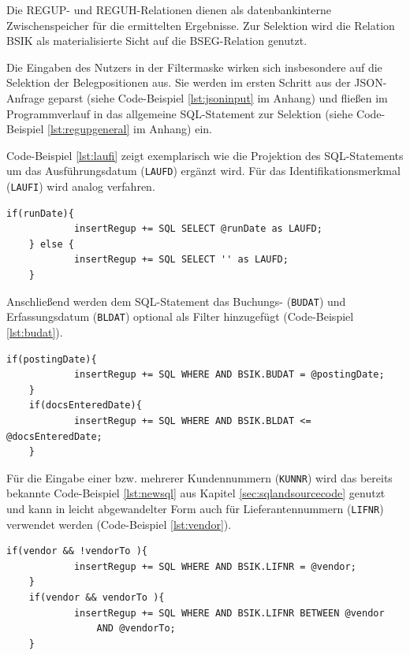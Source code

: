Die REGUP- und REGUH-Relationen dienen als datenbankinterne Zwischenspeicher für die ermittelten Ergebnisse.
Zur Selektion wird die Relation BSIK als materialisierte Sicht auf die BSEG-Relation genutzt.

Die Eingaben des Nutzers in der Filtermaske wirken sich insbesondere auf die Selektion der Belegpositionen aus.
Sie werden im ersten Schritt aus der JSON-Anfrage geparst (siehe Code-Beispiel \ref{lst:jsoninput} im Anhang) und fließen im Programmverlauf in das allgemeine SQL-Statement zur Selektion (siehe Code-Beispiel \ref{lst:regupgeneral} im Anhang) ein.

Code-Beispiel \ref{lst:laufi} zeigt exemplarisch wie die Projektion des SQL-Statements um das Ausführungsdatum (\texttt{LAUFD}) ergänzt wird.
Für das Identifikationsmerkmal (\texttt{LAUFI}) wird analog verfahren.

\begin{lstlisting}[caption={Ergänzung der Projektion um das Ausführungsdatum}, label={lst:laufi}, language=JavaScriptSQL]
	if(runDate){
			insertRegup += SQL SELECT @runDate as LAUFD;
	} else {
			insertRegup += SQL SELECT '' as LAUFD;
	}
\end{lstlisting}

Anschließend werden dem SQL-Statement das Buchungs- (\texttt{BUDAT}) und Erfassungsdatum (\texttt{BLDAT}) optional als Filter hinzugefügt (Code-Beispiel \ref{lst:budat}).

\begin{lstlisting}[caption={Einfügen zusätzlicher Filter}, label={lst:budat}, language=JavaScriptSQL]
	if(postingDate){
			insertRegup += SQL WHERE AND BSIK.BUDAT = @postingDate;
	}
	if(docsEnteredDate){
			insertRegup += SQL WHERE AND BSIK.BLDAT <= @docsEnteredDate;
	}
\end{lstlisting}

Für die Eingabe einer bzw. mehrerer Kundennummern (\texttt{KUNNR}) wird das bereits bekannte Code-Beispiel \ref{lst:newsql} aus Kapitel \ref{sec:sqlandsourcecode} genutzt und kann in leicht abgewandelter Form auch für Lieferantennummern (\texttt{LIFNR}) verwendet werden (Code-Beispiel \ref{lst:vendor}).

\begin{lstlisting}[caption={Unterscheidung zwischen Einzel- und Bereichsfilter}, label={lst:vendor}, language=JavaScriptSQL]
	if(vendor && !vendorTo ){
			insertRegup += SQL WHERE AND BSIK.LIFNR = @vendor;
	}
	if(vendor && vendorTo ){
			insertRegup += SQL WHERE AND BSIK.LIFNR BETWEEN @vendor
				AND @vendorTo;
	}
\end{lstlisting}


